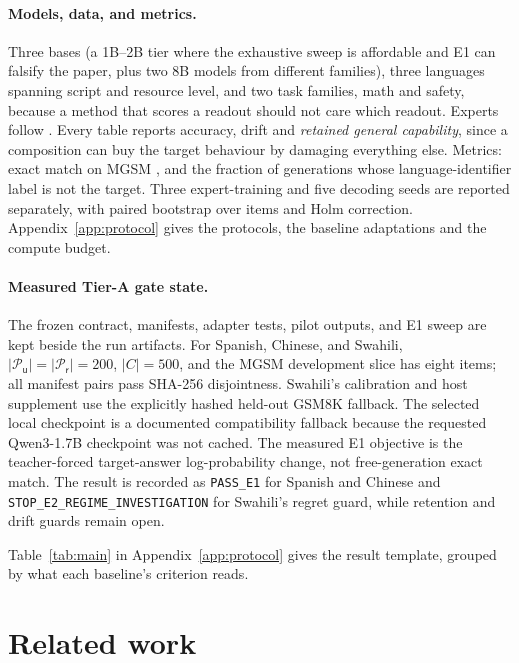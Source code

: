 \documentclass[10pt]{article}
\theoremstyle{plain}
\theoremstyle{definition}
\theoremstyle{remark}
\newcommand{\util}{\mathsf{u}}
\newcommand{\risk}{\mathsf{r}}
\begin{document}
\paragraph{Models, data, and metrics.}
Three bases (a 1B--2B tier where the exhaustive sweep is affordable and E1 can
falsify the paper, plus two 8B models from different families), three languages
spanning script and resource level, and two task families, math and safety,
because a method that scores a readout should not care which readout. Experts
follow \citet{bandarkar2025layerswap}. Every table reports accuracy, drift and
\emph{retained general capability}, since a composition can buy the target
behaviour by damaging everything else. Metrics: exact match on MGSM
\citep{shi2022mgsm}, and the fraction of generations whose language-identifier
label \citep{grave2018fasttext} is not the target. Three expert-training and five
decoding seeds are reported separately, with paired bootstrap over items and Holm
correction. Appendix~\ref{app:protocol} gives the protocols, the baseline
adaptations and the compute budget.

\paragraph{Measured Tier-A gate state.}
The frozen contract, manifests, adapter tests, pilot outputs, and E1 sweep are
kept beside the run artifacts. For Spanish, Chinese, and Swahili,
$|\mathcal{P}_\util|=|\mathcal{P}_\risk|=200$, $|C|=500$, and the MGSM
development slice has eight items; all manifest pairs pass SHA-256
disjointness. Swahili's calibration and host supplement use the explicitly
hashed held-out GSM8K fallback. The selected local checkpoint is a documented
compatibility fallback because the requested Qwen3-1.7B checkpoint was not
cached. The measured E1 objective is the teacher-forced target-answer
log-probability change, not free-generation exact match. The result is
recorded as \texttt{PASS\_E1} for Spanish and Chinese and
\texttt{STOP\_E2\_REGIME\_INVESTIGATION} for Swahili's regret guard, while
retention and drift guards remain open.


Table~\ref{tab:main} in Appendix~\ref{app:protocol} gives the result template,
grouped by what each baseline's criterion reads.


\section{Related work}
\label{sec:related}
\end{document}
